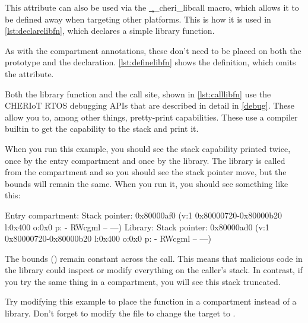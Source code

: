 {{This attribute can also be used via the \c{__cheri_libcall} macro, which allows it to be defined away when targeting other platforms.
This is how it is used in \ref{lst:declarelibfn}, which declares a simple library function.

\codelisting[filename=examples/library_annotation/interface.h,marker=library_export,label=lst:declarelibfn,caption="A declaration of a library function"]{}

As with the compartment annotations, these don't need to be placed on both the prototype and the declaration.
\ref{lst:definelibfn} shows the definition, which omits the attribute.

\codelisting[filename=examples/library_annotation/library.cc,marker=library_implementation,label=lst:definelibfn,caption="A definition of a library function"]{}

Both the library function and the call site, shown in \ref{lst:calllibfn} use the CHERIoT RTOS debugging APIs that are described in detail in \ref{debug}.
These allow you to, among other things, pretty-print capabilities.
These use a compiler builtin to get the capability to the stack and print it.

\codelisting[filename=examples/library_annotation/entry.cc,marker=entry,label=lst:calllibfn,caption="Calling a simple library function."]{}

When you run this example, you should see the stack capability printed twice, once by the entry compartment and once by the library.
The library is called from the compartment and so you should see the stack pointer move, but the bounds will remain the same.
When you run it, you should see something like this:

\begin{console}
Entry compartment: Stack pointer: 0x80000af0 (v:1 0x80000720-0x80000b20 l:0x400 o:0x0 p: - RWcgml -- ---)
Library: Stack pointer: 0x80000ad0 (v:1 0x80000720-0x80000b20 l:0x400 o:0x0 p: - RWcgml -- ---)
\end{console}

The bounds () remain constant across the call.
This means that malicious code in the library could inspect or modify everything on the caller's stack.
In contrast, if you try the same thing in a compartment, you will see this stack truncated.

Try modifying this example to place the function in a compartment instead of a library.
Don't forget to modify the  file to change the  target to .

}}
